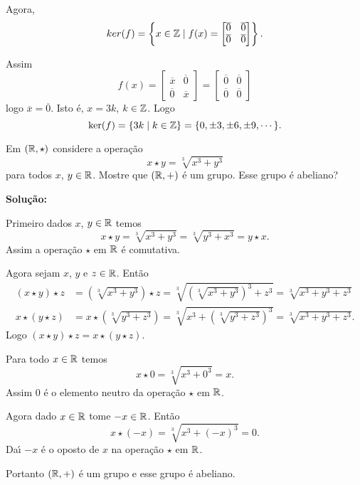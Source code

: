 \documentclass[12pt]{exam}
\begin{document}
Agora,
\[
	ker(f) = \left\{x \in \mathbb{Z} \mid f(x) = \begin{bmatrix}
		\overline{0} & \overline{0}\\
		\overline{0} & \overline{0}
	\end{bmatrix}\right\}.
\]

Assim
\[
	f(x) = \begin{bmatrix}
		\overline{x} & \overline{0}\\
		\overline{0} & \overline{x}
	\end{bmatrix} = \begin{bmatrix}
		\overline{0} & \overline{0}\\
		\overline{0} & \overline{0}
	\end{bmatrix}
\]
logo $\overline{x} = \overline{0}$. Isto \'e, $x = 3k$, $k \in \mathbb{Z}$. Logo 
\[
	\ker(f) = \{3k \mid k \in \mathbb{Z}\} = \{0, \pm 3, \pm 6, \pm 9, \cdots\}.
\]

\vspace{1cm}

\questao{} Em $(\mathbb{R} , \star)$ considere a opera\c{c}\~ao
\[
	x\star y = \sqrt[3]{x^3 + y^3}
\]
para todos $x$, $y \in \mathbb{R}$. Mostre que $(\mathbb{R}, +)$ \'e um grupo. Esse grupo é abeliano?

\noindent\textbf{Solu\c{c}\~ao:}

Primeiro dados $x$, $y \in \mathbb{R}$ temos
\[
	x \star y = \sqrt[3]{x^3 + y^3} = \sqrt[3]{y^3 + x^3} = y \star x.
\]
Assim a opera\c{c}\~ao $\star$ em $\mathbb{R}$ \'e comutativa.

Agora sejam $x$, $y$ e $z \in \mathbb{R}$. Ent\~ao
\begin{align*}
	(x \star y) \star z &= (\sqrt[3]{x^3 + y^3})\star z = \sqrt[3]{(\sqrt[3]{x^3 + y^3})^3 + z^3} = \sqrt[3]{x^3 + y^3 + z^3}\\
	x \star (y \star z) &= x \star (\sqrt[3]{y^3 + z^3}) = \sqrt[3]{x^3 + (\sqrt[3]{y^3 + z^3})^3} = \sqrt[3]{x^3 + y^3 + z^3}.
\end{align*}
Logo $(x \star y) \star z = x \star (y \star z)$.

Para todo $x \in \mathbb{R}$ temos
\[
	x \star 0 = \sqrt[3]{x^3 + 0^3} = x.
\]
Assim $0$ \'e o elemento neutro da opera\c{c}\~ao $\star$ em $\mathbb{R}$.

Agora dado $x \in \mathbb{R}$ tome $-x \in \mathbb{R}$. Ent\~ao
\[
	x \star (-x) = \sqrt[3]{x^3 + (-x)^3} = 0.
\]
Da{\'\i} $-x$ \'e o oposto de $x$ na operação $\star$ em $\mathbb{R}$.

Portanto $(\mathbb{R},+)$ \'e um grupo e esse grupo é abeliano.
\end{document}
